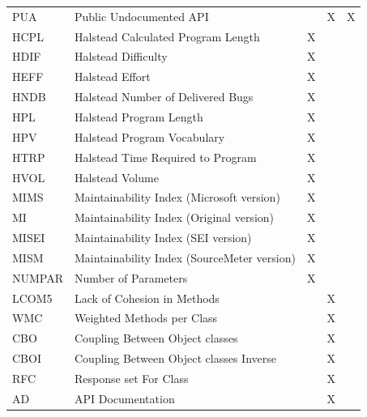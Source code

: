 \begin{table}[H]
{\begin{tabular}{lllll}
PUA         & Public Undocumented API                       &        & X     & X       \\
HCPL        & Halstead Calculated Program Length            & X      &       &         \\
HDIF        & Halstead Difficulty                           & X      &       &         \\
HEFF        & Halstead Effort                               & X      &       &         \\
HNDB        & Halstead   Number of Delivered Bugs           & X      &       &         \\
HPL         & Halstead Program Length                       & X      &       &         \\
HPV         & Halstead Program   Vocabulary                 & X      &       &         \\
HTRP        & Halstead Time   Required to Program           & X      &       &         \\
HVOL        & Halstead Volume                               & X      &       &         \\
MIMS        & Maintainability Index (Microsoft version)     & X      &       &         \\
MI          & Maintainability Index   (Original version)    & X      &       &         \\
MISEI       & Maintainability Index (SEI version)           & X      &       &         \\
MISM        & Maintainability Index   (SourceMeter version) & X      &       &         \\
NUMPAR      & Number of Parameters                          & X      &       &         \\
LCOM5       & Lack   of Cohesion in Methods                 &        & X     &         \\
WMC         & Weighted Methods per Class                    &        & X     &         \\
CBO         & Coupling Between Object   classes             &        & X     &         \\
CBOI        & Coupling Between   Object classes Inverse     &        & X     &         \\
RFC         & Response set For Class                        &        & X     &         \\
AD          & API Documentation                             &        & X     &         \\

\end{tabular}}
\end{table}
